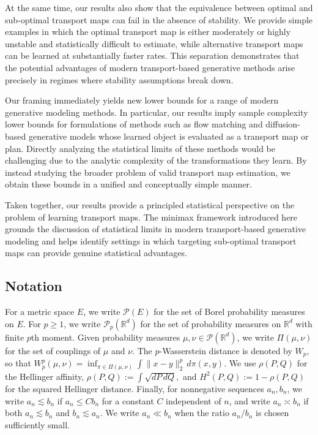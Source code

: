 \documentclass[11pt,twoside]{article}
\begin{document}
At the same time, our results also show that the equivalence between optimal and sub-optimal transport maps can fail in the absence of stability. We provide simple examples in which the optimal transport map is either moderately or highly unstable and statistically difficult to estimate, while alternative transport maps can be learned at substantially faster rates. This separation demonstrates that the potential advantages of modern transport-based generative methods arise precisely in regimes where stability assumptions break down.

Our framing immediately yields new lower bounds for a range of modern generative modeling methods. 
In particular, our results imply sample complexity lower bounds for formulations of methods such as flow matching and diffusion-based generative models whose learned object is evaluated as a transport map or plan.
Directly analyzing the statistical limits of these methods would be challenging due to the analytic complexity of the transformations they learn. By instead studying the broader problem of valid transport map estimation, we obtain these bounds in a unified and conceptually simple manner.

Taken together, our results provide a principled statistical perspective on the problem of learning transport maps. The minimax framework introduced here grounds the discussion of statistical limits in modern transport-based generative modeling and helps identify settings in which targeting sub-optimal transport maps can provide genuine statistical advantages.

\subsection{Notation}
For a metric space $E$, we write $\mathcal P(E)$ for the set of Borel probability measures on $E$. For $p\geq 1$, we write $\mathcal P_p(\mathbb R^d)$ for the set of probability measures on $\mathbb R^d$ with finite $p$th moment. Given probability measures $\mu,\nu\in\mathcal P(\mathbb R^d)$, we write $\Pi(\mu,\nu)$ for the set of couplings of $\mu$ and $\nu$. The $p$-Wasserstein distance is denoted by $W_p$, so that $W_p^p(\mu,\nu)
=
\inf_{\pi\in\Pi(\mu,\nu)}
\int \|x-y\|_2^p\,d\pi(x,y).$
We use $\rho(P,Q)$ for the Hellinger affinity,
$\rho(P,Q)
:=
\int \sqrt{dP\,dQ},$
and $H^2(P,Q):=1-\rho(P,Q)$ for the squared Hellinger distance. Finally, for nonnegative sequences $a_n,b_n$, we write $a_n\lesssim b_n$ if $a_n\leq Cb_n$ for a constant $C$ independent of $n$, and write $a_n\asymp b_n$ if both $a_n\lesssim b_n$ and $b_n\lesssim a_n$. We write $a_n\ll b_n$ when the ratio $a_n/b_n$ is chosen sufficiently small. 
\end{document}
